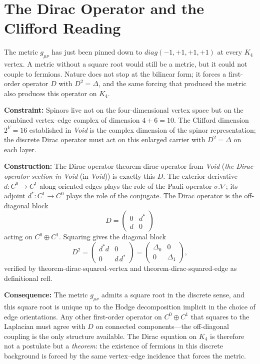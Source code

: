 \documentclass[11pt,a4paper]{book}
\def\cdot{.}%
\def\mathrm#1{#1}%
\def\texttt#1{#1}%
\newcommand{\VoidRef}[2]{\textit{#2} (in \textit{Void})}
\begin{document}
\section{The Dirac Operator and the Clifford Reading}
\label{sec:dirac-clifford}

The metric $g_{\mu\nu}$ has just been pinned down to $\mathrm{diag}(-1,+1,+1,+1)$ at every $K_4$ vertex. A metric without a square root would still be a metric, but it could not couple to fermions. Nature does not stop at the bilinear form; it forces a first-order operator $D$ with $D^2 = \Delta$, and the same forcing that produced the metric also produces this operator on $K_4$.

\textbf{Constraint:} Spinors live not on the four-dimensional vertex space but on the combined vertex--edge complex of dimension $4 + 6 = 10$. The Clifford dimension $2^V = 16$ established in \textit{Void} is the complex dimension of the spinor representation; the discrete Dirac operator must act on this enlarged carrier with $D^2 = \Delta$ on each layer.

\textbf{Construction:} The Dirac operator \texttt{theorem-dirac-operator} from \textit{Void} (\VoidRef{sec:dirac-square-laplacian}{the Dirac-operator section in Void}) is exactly this $D$. The exterior derivative $d : C^0 \to C^1$ along oriented edges plays the role of the Pauli operator $\sigma \cdot \nabla$; its adjoint $d^* : C^1 \to C^0$ plays the role of the conjugate. The Dirac operator is the off-diagonal block
\[
D = \begin{pmatrix} 0 & d^* \\ d & 0 \end{pmatrix}
\]
acting on $C^0 \oplus C^1$. Squaring gives the diagonal block
\[
D^2 = \begin{pmatrix} d^* d & 0 \\ 0 & d\,d^* \end{pmatrix} = \begin{pmatrix} \Delta_0 & 0 \\ 0 & \Delta_1 \end{pmatrix},
\]
verified by \texttt{theorem-dirac-squared-vertex} and \texttt{theorem-dirac-squared-edge} as definitional \texttt{refl}.

\textbf{Consequence:} The metric $g_{\mu\nu}$ admits a square root in the discrete sense, and this square root is unique up to the Hodge decomposition implicit in the choice of edge orientations. Any other first-order operator on $C^0 \oplus C^1$ that squares to the Laplacian must agree with $D$ on connected components---the off-diagonal coupling is the only structure available. The Dirac equation on $K_4$ is therefore not a postulate but a \emph{theorem}: the existence of fermions in this discrete background is forced by the same vertex--edge incidence that forces the metric.
\end{document}
